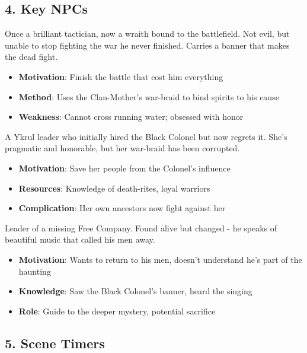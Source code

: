 \documentclass[11pt]{article}
\begin{document}
\subsection*{4. Key NPCs}

\begin{description}[leftmargin=*]
\item[The Black Colonel (Antagonist/Enigma)] Once a brilliant tactician, now a wraith bound to the battlefield. Not evil, but unable to stop fighting the war he never finished. Carries a banner that makes the dead fight. 
\begin{itemize}
\item \textbf{Motivation}: Finish the battle that cost him everything
\item \textbf{Method}: Uses the Clan-Mother's war-braid to bind spirits to his cause
\item \textbf{Weakness}: Cannot cross running water; obsessed with honor
\end{itemize}

\item[Clan-Mother Yara (Allies/Obstacle)] A Ykrul leader who initially hired the Black Colonel but now regrets it. She's pragmatic and honorable, but her war-braid has been corrupted.
\begin{itemize}
\item \textbf{Motivation}: Save her people from the Colonel's influence
\item \textbf{Resources}: Knowledge of death-rites, loyal warriors
\item \textbf{Complication}: Her own ancestors now fight against her
\end{itemize}

\item[Captain Thorne (Red Herring/Ally)] Leader of a missing Free Company. Found alive but changed - he speaks of beautiful music that called his men away.
\begin{itemize}
\item \textbf{Motivation}: Wants to return to his men, doesn't understand he's part of the haunting
\item \textbf{Knowledge}: Saw the Black Colonel's banner, heard the singing
\item \textbf{Role}: Guide to the deeper mystery, potential sacrifice
\end{itemize}
\end{description}

\subsection*{5. Scene Timers}
\end{document}
